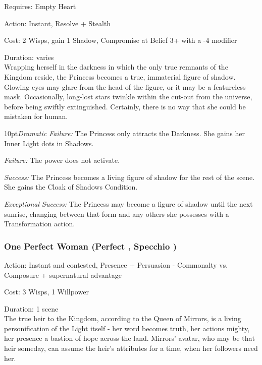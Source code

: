 \noindent Requires: Empty Heart

\noindent Action: Instant, Resolve + Stealth

\noindent Cost: 2 Wisps, gain 1 Shadow, Compromise at Belief 3+ with a -4 modifier

\noindent Duration: varies \\

\noindent Wrapping herself in the darkness in which the only true remnants of the Kingdom reside, the Princess becomes a true, immaterial figure of shadow. Glowing eyes may glare from the head of the figure, or it may be a featureless mask. Occasionally, long-lost stars twinkle within the cut-out from the universe, before being swiftly extinguished. Certainly, there is no way that she could be mistaken for human.

    \begin{myindentpar}{10pt}\emph{Dramatic Failure:} The Princess only attracts the Darkness. She gains her Inner Light dots in Shadows.

    \emph{Failure:} The power does not activate.

    \emph{Success:} The Princess becomes a living figure of shadow for the rest of the scene. She gains the Cloak of Shadows Condition.

    \emph{Exceptional Success:} The Princess may become a figure of shadow until the next sunrise, changing between that form and any others she possesses with a Transformation action.\end{myindentpar}

\subsubsection*{One Perfect Woman (Perfect \textbullet\textbullet\textbullet\textbullet\textbullet, Specchio \textbullet\textbullet\textbullet\textbullet)}

\noindent Action: Instant and contested, Presence + Persuasion - Commonalty vs. Composure + supernatural advantage

\noindent Cost: 3 Wisps, 1 Willpower

\noindent Duration: 1 scene \\
 
\noindent The true heir to the Kingdom, according to the Queen of Mirrors, is a living personification of the Light itself - her word becomes truth, her actions mighty, her presence a bastion of hope across the land. Mirrors' avatar, who may be that heir someday, can assume the heir's attributes for a time, when her followers need her.

